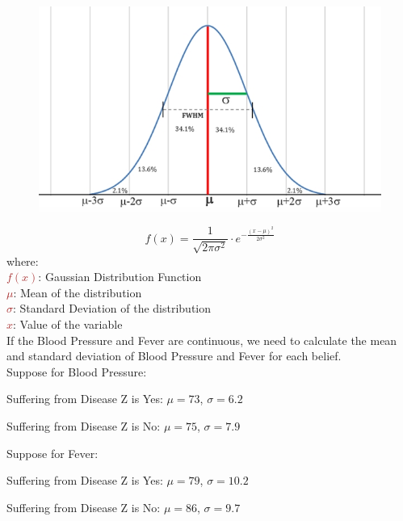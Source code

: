 \documentclass{book}
\begin{document}
\begin{figure}
    \centering
    \includegraphics[scale=0.32]{chapter 3/ch3_figure5.jpeg}
\end{figure}
\[
    f(x) = \frac{1}{\sqrt{2\pi\sigma^2}} \cdot e^{-\frac{(x-\mu)^2}{2\sigma^2}}
\]
where:\\
\textcolor{brown}{\(f(x)\)}: Gaussian Distribution Function\\
\textcolor{brown}{\(\mu\)}: Mean of the distribution\\
\textcolor{brown}{\(\sigma\)}: Standard Deviation of the distribution\\
\textcolor{brown}{\(x\)}: Value of the variable\\
\vspace{1.5cm}
If the Blood Pressure and Fever are continuous, we need to calculate the mean and standard deviation of Blood Pressure and Fever for each belief.\\
Suppose for Blood Pressure:
\begin{description}
    \centering
    \item[$\bullet$] Suffering from Disease Z is Yes: \(\mu = 73\), \(\sigma = 6.2\)
    \item[$\bullet$] Suffering from Disease Z is No: \(\mu = 75\), \(\sigma = 7.9\)
\end{description}
Suppose for Fever:
\begin{description}
    \centering
    \item[$\bullet$] Suffering from Disease Z is Yes: \(\mu = 79\), \(\sigma = 10.2\)
    \item[$\bullet$] Suffering from Disease Z is No: \(\mu = 86\), \(\sigma = 9.7\)
\end{description}
\vspace{1mm}
\end{document}

